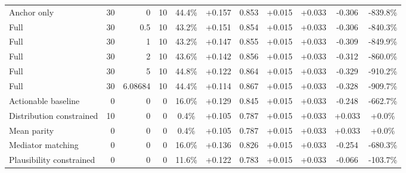 \begin{table}[htbp]
\begin{tabular}{lrrrccccccc}
Anchor only & 30 & 0 & 10 & 44.4\% & +0.157 & 0.853 & +0.015 & +0.033 & -0.306 & -839.8\% \\
Full & 30 & 0.5 & 10 & 43.2\% & +0.151 & 0.854 & +0.015 & +0.033 & -0.306 & -840.3\% \\
Full & 30 & 1 & 10 & 43.2\% & +0.147 & 0.855 & +0.015 & +0.033 & -0.309 & -849.9\% \\
Full & 30 & 2 & 10 & 43.6\% & +0.142 & 0.856 & +0.015 & +0.033 & -0.312 & -860.0\% \\
Full & 30 & 5 & 10 & 44.8\% & +0.122 & 0.864 & +0.015 & +0.033 & -0.329 & -910.2\% \\
Full & 30 & 6.08684 & 10 & 44.4\% & +0.114 & 0.867 & +0.015 & +0.033 & -0.328 & -909.7\% \\
Actionable baseline & 0 & 0 & 0 & 16.0\% & +0.129 & 0.845 & +0.015 & +0.033 & -0.248 & -662.7\% \\
Distribution constrained & 10 & 0 & 0 & 0.4\% & +0.105 & 0.787 & +0.015 & +0.033 & +0.033 & +0.0\% \\
Mean parity & 0 & 0 & 0 & 0.4\% & +0.105 & 0.787 & +0.015 & +0.033 & +0.033 & +0.0\% \\
Mediator matching & 0 & 0 & 0 & 16.0\% & +0.136 & 0.826 & +0.015 & +0.033 & -0.254 & -680.3\% \\
Plausibility constrained & 0 & 0 & 0 & 11.6\% & +0.122 & 0.783 & +0.015 & +0.033 & -0.066 & -103.7\% \\
\bottomrule
\end{tabular}
\end{table}